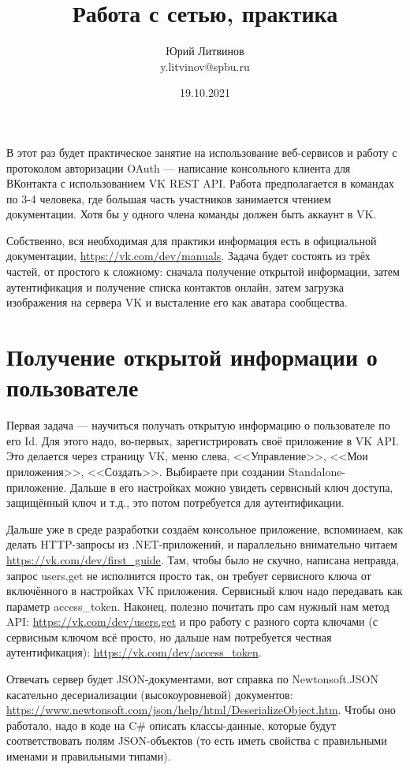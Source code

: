 \documentclass[a5paper]{article}
\title{Работа с сетью, практика}
\author{Юрий Литвинов\\\small{y.litvinov@spbu.ru}}
\date{19.10.2021}
\begin{document}
\maketitle
\thispagestyle{empty}

В этот раз будет практическое занятие на использование веб-сервисов и работу с протоколом авторизации OAuth --- написание консольного клиента для ВКонтакта с использованием VK REST API. Работа предполагается в командах по 3-4 человека, где большая часть участников занимается чтением документации. Хотя бы у одного члена команды должен быть аккаунт в VK.

Собственно, вся необходимая для практики информация есть в официальной документации, \url{https://vk.com/dev/manuals}. Задача будет состоять из трёх частей, от простого к сложному: сначала получение открытой информации, затем аутентификация и получение списка контактов онлайн, затем загрузка изображения на сервера VK и высталение его как аватара сообщества.

\section{Получение открытой информации о пользователе}

Первая задача --- научиться получать открытую информацию о пользователе по его Id. Для этого надо, во-первых, зарегистрировать своё приложение в VK API. Это делается через страницу VK, меню слева, <<Управление>>, <<Мои приложения>>, <<Создать>>. Выбираете при создании Standalone-приложение. Дальше в его настройках можно увидеть сервисный ключ доступа, защищённый ключ и т.д., это потом потребуется для аутентификации.

Дальше уже в среде разработки создаём консольное приложение, вспоминаем, как делать HTTP-запросы из .NET-приложений, и параллельно внимательно читаем \url{https://vk.com/dev/first_guide}. Там, чтобы было не скучно, написана неправда, запрос users.get не исполнится просто так, он требует сервисного ключа от включённого в настройках VK приложения. Сервисный ключ надо передавать как параметр access\_token. Наконец, полезно почитать про сам нужный нам метод API: \url{https://vk.com/dev/users.get} и про работу с разного сорта ключами (с сервисным ключом всё просто, но дальше нам потребуется честная аутентификация): \url{https://vk.com/dev/access_token}.

Отвечать сервер будет JSON-документами, вот справка по Newtonsoft.JSON касательно десериализации (высокоуровневой) документов: \url{https://www.newtonsoft.com/json/help/html/DeserializeObject.htm}. Чтобы оно работало, надо в коде на C\# описать классы-данные, которые будут соответствовать полям JSON-объектов (то есть иметь свойства с правильными именами и правильными типами).
\end{document}
